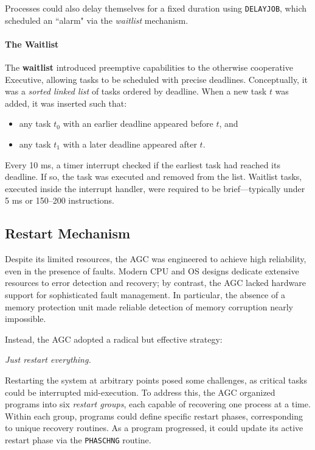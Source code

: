 Processes could also delay themselves for a fixed duration using \texttt{DELAYJOB},
which scheduled an ``alarm" via the \emph{waitlist} mechanism.

\paragraph*{The Waitlist} The \textbf{waitlist} introduced preemptive capabilities to
the otherwise cooperative Executive, allowing tasks to be scheduled with precise
deadlines. Conceptually, it was a \emph{sorted linked list} of tasks ordered by
deadline. When a new task \(t\) was added, it was inserted such that:
\begin{itemize}
    \item any task \(t_0\) with an earlier deadline appeared before \(t\), and
    \item any task \(t_1\) with a later deadline appeared after \(t\).
\end{itemize}

Every 10 ms, a timer interrupt checked if the earliest task had reached its deadline.
If so, the task was executed and removed from the list. Waitlist tasks, executed inside
the interrupt handler, were required to be brief—typically under 5 ms or 150–200
instructions.

\subsection{Restart Mechanism}

Despite its limited resources, the AGC was engineered to achieve high reliability, even
in the presence of faults. Modern CPU and OS designs dedicate extensive resources to
error detection and recovery; by contrast, the AGC lacked hardware support for
sophisticated fault management. In particular, the absence of a memory protection unit
made reliable detection of memory corruption nearly impossible.

Instead, the AGC adopted a radical but effective strategy: \vspace{-1em}
\begin{center}
    \emph{Just restart everything.}
\end{center}
\vspace{-1em} Restarting the system at arbitrary points posed some challenges, as
critical tasks could be interrupted mid-execution. To address this, the AGC organized
programs into six \emph{restart groups}, each capable of recovering one process at a
time. Within each group, programs could define specific restart phases, corresponding
to unique recovery routines. As a program progressed, it could update its active
restart phase via the \texttt{PHASCHNG} routine.

